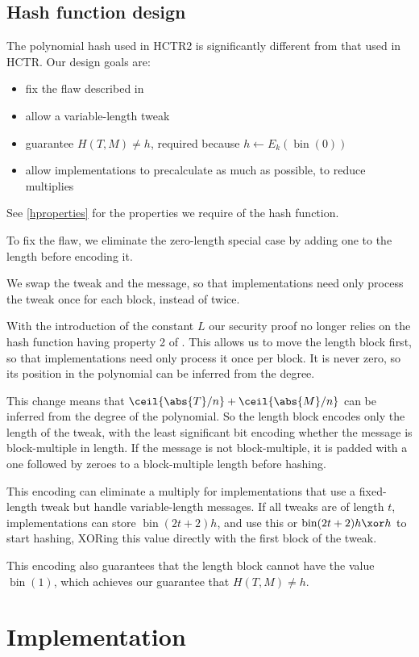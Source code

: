 \documentclass[letterpaper,11pt]{article}
\DeclareMathOperator{\fromint}{bin}
\begin{document}
\subsection{Hash function design}

The polynomial hash used in HCTR2 is significantly different from
that used in HCTR. Our design goals are:

\begin{itemize}
    \item fix the flaw described in \cite{kumarhctr}
    \item allow a variable-length tweak
    \item guarantee \(H(T, M) \neq h\), required
    because \(h \gets E_k(\fromint(0))\)
    \item allow implementations to precalculate as much as possible, to reduce multiplies
\end{itemize}

See \autoref{hproperties}
for the properties we require of the hash function.

To fix the \cite{kumarhctr} flaw, we eliminate the zero-length special case
by adding one to the length before encoding it.

We swap the tweak and the message, so that implementations need only
process the tweak once for each block, instead of twice.

With the introduction of the constant \(L\)
our security proof no longer relies on the hash function
having property 2 of \cite[Section~3.3]{hctr}.
This allows us to move the length block first, so
that implementations need only process it once per block.
It is never zero, so its position in the
polynomial can be inferred from the degree.

This change means that \(\ceil{\abs{T}/n} + \ceil{\abs{M}/n}\)
can be inferred from the degree of the
polynomial. So the length block encodes
only the length of the tweak, 
with the least significant bit encoding 
whether the message is
block-multiple in length. If the message is not
block-multiple, it is padded with a one followed
by zeroes to a block-multiple length before hashing.

This encoding can eliminate a multiply for implementations that use
a fixed-length tweak but handle variable-length messages.
If all tweaks are of length \(t\), implementations can store
\(\fromint(2t + 2)h\), and use this or \(\fromint(2t + 2)h \xor h\)
to start hashing, XORing this value directly with the
first block of the tweak.

This encoding also guarantees that the length block
cannot have the value \(\fromint(1)\), which achieves
our guarantee that \(H(T, M) \neq h\).

\section{Implementation}

\printbibliography[heading=bibintoc]
\end{document}
